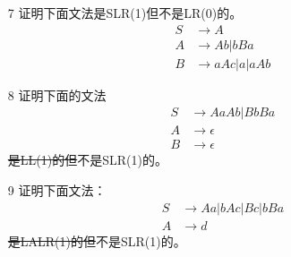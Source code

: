 \documentclass[]{ctexart}
\begin{document}
\begin{enumerate}
	\item[7] 证明下面文法是SLR(1)但不是LR(0)的。
	\begin{align*}
		S &\to A \\
		A &\to Ab | bBa \\
		B &\to aAc | a | aAb
	\end{align*}
	
	\item[8] 证明下面的文法
	\begin{align*}
		S &\to AaAb | BbBa \\
		A &\to \epsilon \\
		B &\to \epsilon
	\end{align*}
	\sout{是LL(1)的但}不是SLR(1)的。
	
	\item[9] 证明下面文法：
	\begin{align*}
		S &\to Aa | bAc | Bc | bBa \\
		A &\to d
	\end{align*}
	\sout{是LALR(1)的但}不是SLR(1)的。
\end{enumerate}
\end{document}
